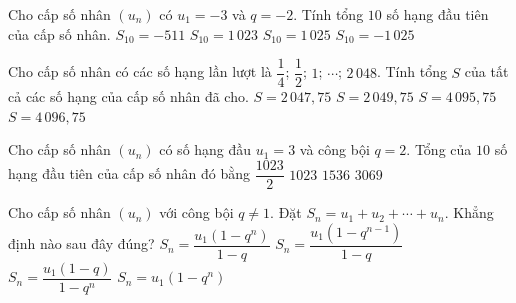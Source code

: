 

\begin{ex}%
	Cho cấp số nhân $\left(u_n\right)$ có $u_1=-3$ và $q=-2$. Tính  tổng $10$ số hạng đầu tiên của cấp số nhân.
	 \choice
		 {$S_{10}=-511$}
		{\True  $S_{10}=1\,023$}
		{$S_{10}=1\,025$} 
		{$S_{10}=-1\,025$} 
\end{ex}

\begin{ex}%
	Cho cấp số nhân có các số hạng lần lượt là $\dfrac{1}{4}$; $\dfrac{1}{2}$; $1$; $\cdots$; $2\,048$. Tính tổng $S$ của tất  cả các số hạng của cấp số nhân đã cho.
	\choice 
		 {\True $S=2\,047{,}75$}
		 {$S=2\,049{,}75$}
		{$S=4\,095{,}75$} 
		 {$S=4\,096{,}75$}
\end{ex}

\begin{ex}%
	Cho cấp số nhân $(u_n)$ có số hạng đầu $u_1=3$ và công bội $q=2$. Tổng của $10$ số hạng đầu tiên  của cấp số nhân đó bằng
	 \choice
		 {$\dfrac{1023}{2}$}
		{$1023$} 
		 {$1536$}
		 {\True $3069$}
\end{ex}

\begin{ex}%
	Cho cấp số nhân $\left(u_n\right)$ với công  bội $q\neq1$. Đặt $S_n=u_1+u_2+\cdots+u_n$. Khẳng định nào sau đây đúng?
	\choice 
		 {\True $S_n=\dfrac{u_1\left(1-q^n\right)}{1-q}$}
		{$S_n=\dfrac{u_1\left(1-q^{n-1}\right)}{1-q}$} 
		{$S_n=\dfrac{u_1(1-q)}{1-q^n}$} 
		{$S_n=u_1\left(1-q^n\right)$} 
\end{ex}


